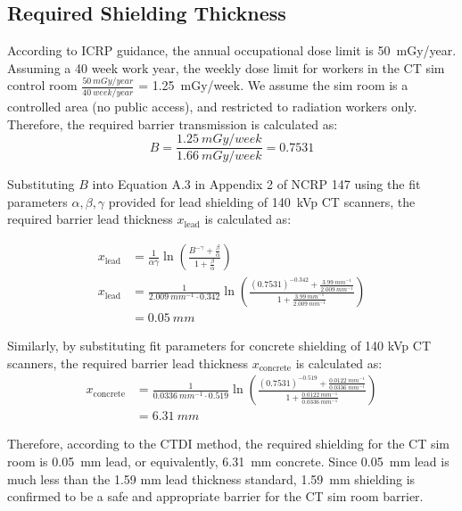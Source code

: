 \documentclass[%
aps,
mph,%
amsmath,amssymb,
preprint,%
tightenlines,
longbibliography,
superscriptaddress,
floatfix,
nofootinbib,
]{revtex4-2}
\begin{document}
    \subsection{Required Shielding Thickness}
            According to ICRP guidance, the annual occupational dose limit is \qty{50}{mGy/year}. Assuming a 40 week work year, the weekly dose limit for workers in the CT sim control room $\frac{\qty{50}{mGy/year}}{\qty{40}{week/year}}$ = \qty{1.25}{mGy/week}. We assume the sim room is a controlled area (no public access), and restricted to radiation workers only. Therefore, the required barrier transmission is calculated as:
        \begin{equation*}
            B = \frac{\qty{1.25}{mGy/week}}{\qty{1.66}{mGy/week}} = 0.7531
        \end{equation*}
        
        Substituting $B$ into Equation A.3 in Appendix 2 of NCRP 147 using the fit parameters $\alpha, \beta, \gamma$ provided for lead shielding of \qty{140}{kVp} CT scanners, the required barrier lead thickness $x\mathrm{_{lead}}$ is calculated as:
        
        \begin{align*}
            x\mathrm{_{lead}} &= \frac{1}{\alpha\gamma}\ln\left(\frac{B^{-\gamma}+\frac{\beta}{\alpha}}{1+ \frac{\beta}{\alpha}} \right)\\
            x\mathrm{_{lead}} &= \frac{1}{\qty{2.009}{mm^{-1}}\cdot0.342}\ln\left(\frac{( 0.7531)^{-0.342}+\frac{\qty{3.99}{mm^{-1}}}{\qty{2.009}{mm^{-1}}}}{1+ \frac{\qty{3.99}{mm^{-1}}}{\qty{2.009}{mm^{-1}}}} \right)\\
            &= \qty{0.05}{mm}
        \end{align*}
        
        Similarly, by substituting fit parameters for concrete shielding of 140 kVp CT scanners, the required barrier lead thickness $x\mathrm{_{concrete}}$ is calculated as:
        \begin{align*}
            x\mathrm{_{concrete}} &= \frac{1}{\qty{0.0336}{mm^{-1}}\cdot0.519}\ln\left(\frac{( 0.7531)^{-0.519}+\frac{\qty{0.0122}{mm^{-1}}}{\qty{0.0336}{mm^{-1}}}}{1+ \frac{\qty{0.0122}{mm^{-1}}}{\qty{0.0336}{mm^{-1}}}} \right)\\
            &= \qty{6.31}{mm}
        \end{align*}
        
        Therefore, according to the CTDI method, the required shielding for the CT sim room is \SI{0.05}{mm} lead, or equivalently, \SI{6.31}{mm} concrete. Since \SI{0.05}{mm} lead is much less than the 1.59 mm lead thickness standard, \SI{1.59}{mm} shielding is confirmed to be a safe and appropriate barrier for the CT sim room barrier.
        
\end{document}
